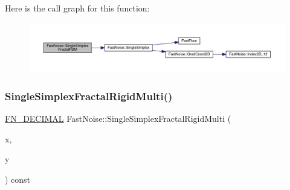 Here is the call graph for this function\+:
\nopagebreak
\begin{figure}[H]
\begin{center}
\leavevmode
\includegraphics[width=350pt]{class_fast_noise_a2ac44ef2c9843f3024a3f0be9a47526b_cgraph}
\end{center}
\end{figure}
\mbox{\label{class_fast_noise_a185d239a0bbbc93f673eeb1fe49eae80}} 
\subsubsection{\texorpdfstring{Single\+Simplex\+Fractal\+Rigid\+Multi()}{SingleSimplexFractalRigidMulti()}\hspace{0.1cm}{\footnotesize\ttfamily [1/2]}}
{\footnotesize\ttfamily \mbox{\hyperlink{_fast_noise_8h_a75a9ef6d2541c4921815b885bfd449c3}{F\+N\+\_\+\+D\+E\+C\+I\+M\+AL}} Fast\+Noise\+::\+Single\+Simplex\+Fractal\+Rigid\+Multi (\begin{DoxyParamCaption}\item[{\mbox{\hyperlink{_fast_noise_8h_a75a9ef6d2541c4921815b885bfd449c3}{F\+N\+\_\+\+D\+E\+C\+I\+M\+AL}}}]{x,  }\item[{\mbox{\hyperlink{_fast_noise_8h_a75a9ef6d2541c4921815b885bfd449c3}{F\+N\+\_\+\+D\+E\+C\+I\+M\+AL}}}]{y }\end{DoxyParamCaption}) const\hspace{0.3cm}{\ttfamily [private]}}

